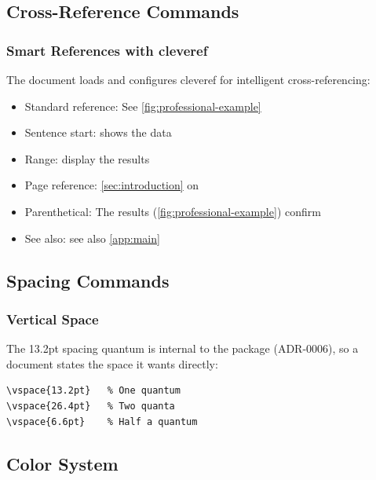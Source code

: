 \subsection{Cross-Reference Commands}

\subsubsection{Smart References with cleveref}

The document loads and configures cleveref for intelligent cross-referencing:

\begin{itemize}
\item Standard reference: See \cref{fig:professional-example}
\item Sentence start:  shows the data
\item Range:  display the results
\item Page reference: \cref{sec:introduction} on 
\item Parenthetical: The results (\cref{fig:professional-example}) confirm
\item See also: see also \cref{app:main}
\end{itemize}

\subsection{Spacing Commands}

\subsubsection{Vertical Space}

The 13.2pt spacing quantum is internal to the package (ADR-0006), so a
document states the space it wants directly:

\begin{verbatim}
\vspace{13.2pt}   % One quantum
\vspace{26.4pt}   % Two quanta
\vspace{6.6pt}    % Half a quantum
\end{verbatim}

\subsection{Color System}

